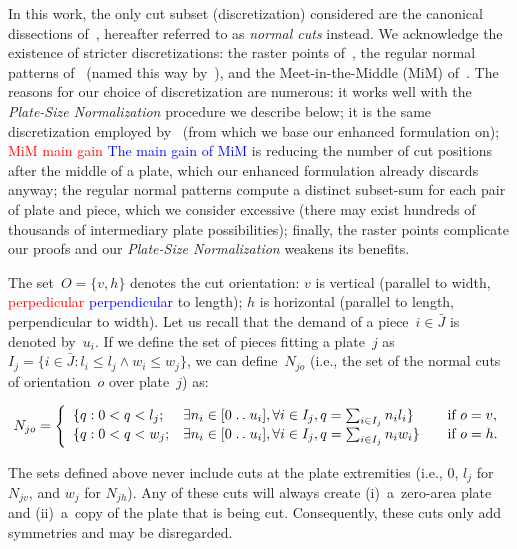 \documentclass[smallextended]{svjour3}       %
\newif\iffinalversion
\newcommand{\newtext}[1]{\iffinalversion%
#1%
\else%
\textcolor{blue}{#1}%
\fi%
}
\newcommand{\oldtext}[1]{\iffinalversion%
\else%
\textcolor{red}{#1}%
\fi%
}
\newcommand{\isep}{\mathrel{{.}\,{.}}\nobreak} %
\begin{document}
In this work, the only cut subset (discretization) considered are the canonical dissections of~\cite{herz:1972}, hereafter referred to as \emph{normal cuts} instead.
We acknowledge the existence of stricter discretizations: the raster points of~\cite{terno:1987,guntram:1966}, the regular normal patterns of~\cite{boschetti:2002} (named this way by~\cite{cote:2018}), and the Meet-in-the-Middle (MiM) of~\cite{cote:2018}.
The reasons for our choice of discretization are numerous:
it works well with the \emph{Plate-Size Normalization} procedure we describe below;
it is the same discretization employed by~\cite{furini:2016} (from which we base our enhanced formulation on);
\oldtext{MiM main gain}\newtext{The main gain of MiM} is reducing the number of cut positions after the middle of a plate, which our enhanced formulation already discards anyway;
the regular normal patterns compute a distinct subset-sum for each pair of plate and piece, which we consider excessive (there may exist hundreds of thousands of intermediary plate possibilities);
finally, the raster points complicate our proofs and our \emph{Plate-Size Normalization} weakens its benefits.

The set~\(O = \{v, h\}\) denotes the cut orientation: \(v\) is vertical (parallel to width, \oldtext{perpedicular}\newtext{perpendicular} to length); \(h\) is horizontal (parallel to length, perpendicular to width).
Let us recall that the demand of a piece~\(i \in \bar{J}\) is denoted by~\(u_i\).
If we define the set of pieces fitting a plate~\(j\) as~\(I_j = \{i \in \bar{J} : l_i \leq l_j \land w_i \leq w_j \}\), we can define~\(N_{jo}\) (i.e., the set of the normal cuts of orientation~\(o\) over plate~\(j\)) as:

{\iffinalversion\else\color{blue}\fi
\begin{equation}
N_{jo}= \left\{
\begin{array}{lllr}
  \{q: 0 < q < l_j; & \exists n_i \in [0 \isep u_i], \forall i \in I_j, q = \sum_{i\in I_j} n_i l_i \} & \quad \text{if } o = v,\\
  \{q: 0 < q < w_j; & \exists n_i \in [0 \isep u_i], \forall i \in I_j, q = \sum_{i\in I_j} n_i w_i \} & \quad \text{if } o = h.
\end{array}\right.
\end{equation}
}

The sets defined above never include cuts at the plate extremities (i.e., \(0\), \(l_j\) for \(N_{jv}\), and \(w_j\) for \(N_{jh}\)).
Any of these cuts will always create (i)~a~zero-area plate and (ii)~a~copy of the plate that is being cut.
Consequently, these cuts only add symmetries and may be disregarded.
\end{document}
